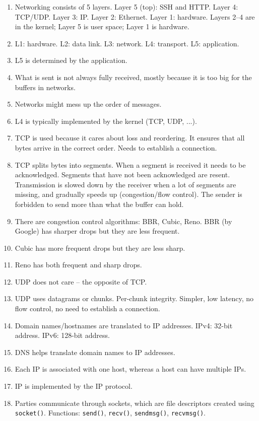\documentclass[12pt,a4paper]{article}
\begin{document}
\begin{enumerate}
  \item Networking consists of 5 layers. Layer 5 (top): SSH and HTTP. Layer 4: TCP/UDP. Layer 3: IP. Layer 2: Ethernet. Layer 1: hardware. Layers 2--4 are in the kernel; Layer 5 is user space; Layer 1 is hardware.
  \item L1: hardware. L2: data link. L3: network. L4: transport. L5: application.
  \item L5 is determined by the application.
  \item What is sent is not always fully received, mostly because it is too big for the buffers in networks.
  \item Networks might mess up the order of messages.
  \item L4 is typically implemented by the kernel (TCP, UDP, ...).
  \item TCP is used because it cares about loss and reordering. It ensures that all bytes arrive in the correct order. Needs to establish a connection.
  \item TCP splits bytes into segments. When a segment is received it needs to be acknowledged. Segments that have not been acknowledged are resent. Transmission is slowed down by the receiver when a lot of segments are missing, and gradually speeds up (congestion/flow control). The sender is forbidden to send more than what the buffer can hold.
  \item There are congestion control algorithms: BBR, Cubic, Reno. BBR (by Google) has sharper drops but they are less frequent.
  \item Cubic has more frequent drops but they are less sharp.
  \item Reno has both frequent and sharp drops.
  \item UDP does not care -- the opposite of TCP.
  \item UDP uses datagrams or chunks. Per-chunk integrity. Simpler, low latency, no flow control, no need to establish a connection.
  \item Domain names/hostnames are translated to IP addresses. IPv4: 32-bit address. IPv6: 128-bit address.
  \item DNS helps translate domain names to IP addresses.
  \item Each IP is associated with one host, whereas a host can have multiple IPs.
  \item IP is implemented by the IP protocol.
  \item Parties communicate through sockets, which are file descriptors created using \texttt{socket()}. Functions: \texttt{send()}, \texttt{recv()}, \texttt{sendmsg()}, \texttt{recvmsg()}.

\end{enumerate}
\end{document}
